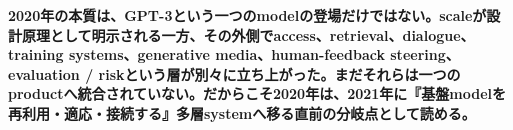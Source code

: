 \noindent\textbf{2020年の本質は、GPT-3という一つのmodelの登場だけではない。scaleが設計原理として明示される一方、その外側でaccess、retrieval、dialogue、training systems、generative media、human-feedback steering、evaluation / riskという層が別々に立ち上がった。まだそれらは一つのproductへ統合されていない。だからこそ2020年は、2021年に『基盤modelを再利用・適応・接続する』多層systemへ移る直前の分岐点として読める。}

